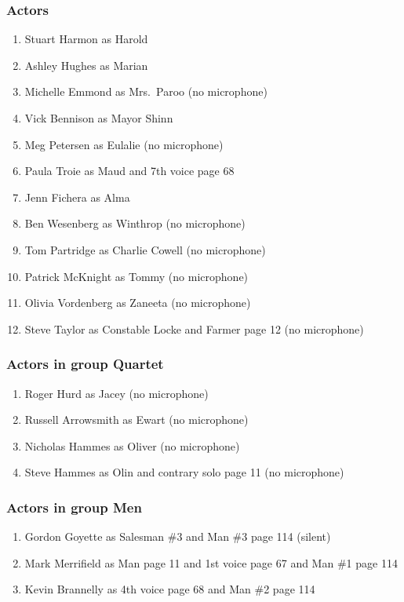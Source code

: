 \subsubsection{Actors}
\begin{enumerate}
\item Stuart Harmon as Harold
\item Ashley Hughes as Marian
\item Michelle Emmond as Mrs.~Paroo (no microphone)
\item Vick Bennison as Mayor Shinn
\item Meg Petersen as Eulalie (no microphone)
\item Paula Troie as Maud and 7th voice page 68
\item Jenn Fichera as Alma
\item Ben Wesenberg as Winthrop (no microphone)
\item Tom Partridge as Charlie Cowell (no microphone)
\item Patrick McKnight as Tommy (no microphone)
\item Olivia Vordenberg as Zaneeta (no microphone)
\item Steve Taylor as Constable Locke and Farmer page 12 (no microphone)
\end{enumerate}
\subsubsection{Actors in group Quartet}
\begin{enumerate}
\item Roger Hurd as Jacey (no microphone)
\item Russell Arrowsmith as Ewart (no microphone)
\item Nicholas Hammes as Oliver (no microphone)
\item Steve Hammes as Olin and contrary solo page 11 (no microphone)
\end{enumerate}
\subsubsection{Actors in group Men}
\begin{enumerate}
\item Gordon Goyette as Salesman \#3 and Man \#3 page 114 (silent)
\item Mark Merrifield as Man page 11 and 1st voice page 67 and Man \#1 page 114
\item Kevin Brannelly as 4th voice page 68 and Man \#2 page 114
\end{enumerate}
